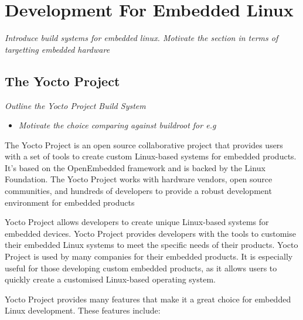 \section[Development Process for Embedded Linux]{Development For Embedded Linux}
\textit{Introduce build systems for embedded linux. Motivate the section in terms of targetting embedded hardware}

\subsection[Build Systems : The Yocto Project]{The Yocto Project}
\textit{Outline the Yocto Project Build System}

\begin{itemize}
	\item \textit{Motivate the choice comparing against buildroot for e.g}
\end{itemize}

The Yocto Project is an open source collaborative project that provides users with a set of tools to create custom Linux-based systems for embedded products. It's based on the OpenEmbedded framework and is backed by the Linux Foundation. The Yocto Project works with hardware vendors, open source communities, and hundreds of developers to provide a robust development environment for embedded products

Yocto Project allows developers to create unique Linux-based systems for embedded devices. Yocto Project provides developers with the tools to customise their embedded Linux systems to meet the specific needs of their products. Yocto Project is used by many companies for their embedded products. It is especially useful for those developing custom embedded products, as it allows users to quickly create a customised Linux-based operating system.

Yocto Project provides many features that make it a great choice for embedded Linux development. These features include:

